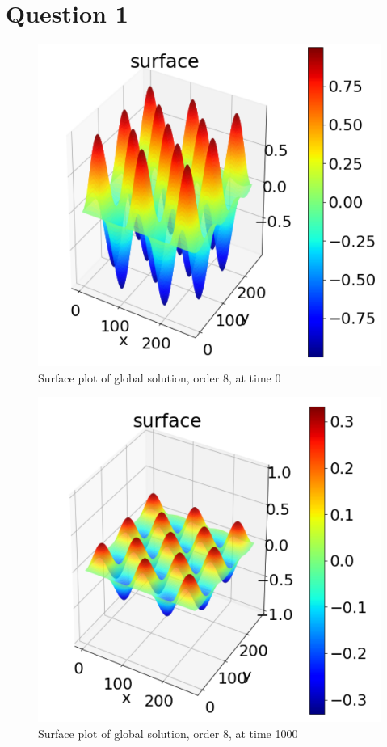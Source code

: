 \section{Question 1}
\begin{figure}[!ht]
	\centering
	\includegraphics[scale=0.5]{surf_0.pdf}
	\caption{Surface plot of global solution, order 8, at time 0}
\end{figure}

\begin{figure}[!ht]
	\centering
	\includegraphics[scale=0.5]{surf_1.pdf}
	\caption{Surface plot of global solution, order 8, at time 1000}
\end{figure}

